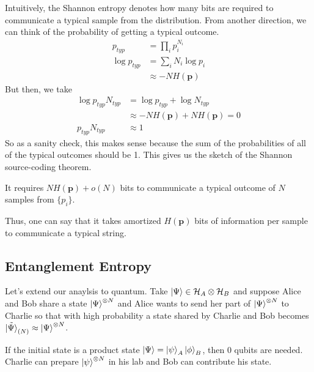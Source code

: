 Intuitively, the Shannon entropy denotes how many bits are required to communicate a typical sample from the distribution.
From another direction, we can think of the probability of getting a typical outcome.
\begin{align*}
    p_{typ} &= \prod_i p_i^{N_i} \\
    \log p_{typ} &= \sum_i N_i \log p_i \\
    &\approx -N H(\mathbf{p})
\end{align*}
But then, we take
\begin{align*}
    \log p_{typ} N_{typ} &= \log p_{typ} + \log N_{typ} \\
    &\approx -N H(\mathbf{p}) + N H(\mathbf{p}) = 0 \\
    p_{typ} N_{typ} &\approx 1
\end{align*}
So as a sanity check, this makes sense because the sum of the probabilities of all of the typical outcomes should be 1. This gives us the sketch of the Shannon source-coding theorem.

\begin{theorem}
   It requires $N H(\mathbf{p}) + o(N)$ bits to communicate a typical outcome of $N$ samples from $\{p_i\}$. 
\end{theorem}

Thus, one can say that it takes amortized $H(\mathbf{p})$ bits of information per sample to communicate a typical string.

\subsection{Entanglement Entropy}
Let's extend our anaylsis to quantum. Take $\ket{\Psi} \in \mathcal{H}_A \otimes \mathcal{H}_B$ and suppose Alice and Bob share a state
$\ket{\Psi}^{\otimes N}$ and Alice wants to send her part of $\ket{\Psi}^{\otimes N}$ to Charlie
so that with high probability a state shared by Charlie and Bob becomes $\tilde{\ket{\Psi}}_{(N)} \approx \ket{\Psi}^{\otimes N}$.

If the initial state is a product state $\ket{\Psi} = \ket{\psi}_A \ket{\phi}_B$,
then 0 qubits are needed. Charlie can prepare $\ket{\psi}^{\otimes N}$ in his lab and Bob can contribute his state.

